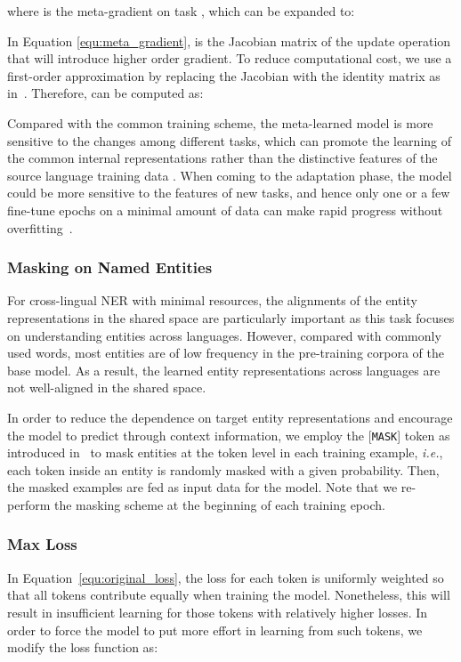 \documentclass[letterpaper]{article} \usepackage{aaai20}  \usepackage{times}  \usepackage{helvet} \usepackage{courier}  \usepackage[hyphens]{url}  \usepackage{graphicx} \urlstyle{rm} \def\UrlFont{\rm}  \usepackage{graphicx}
\newcommand{\ie}{\textit{i.e.}}
\begin{document}
where  is the meta-gradient on task , which can be expanded to:


In Equation \ref{equ:meta_gradient},  is the Jacobian matrix of the update operation  that will introduce higher order gradient.
To reduce computational cost, we use a first-order approximation by replacing the Jacobian  with the identity matrix as in~\cite{finn2017model}. Therefore,  can be computed as:


Compared with the common training scheme, the meta-learned model is more sensitive to the changes among different tasks, which can promote the learning of the common internal representations rather than the distinctive features of the source language training data .
When coming to the adaptation phase, the model could be more sensitive to the features of new tasks, and hence only one or a few fine-tune epochs on a minimal amount of data can make rapid progress without overfitting~\cite{finn2017model}.

\subsubsection{Masking on Named Entities} 
For cross-lingual NER with minimal resources, the alignments of the entity representations in the shared space are particularly important as this task focuses on understanding entities across languages. However, compared with commonly used words, most entities are of low frequency in the pre-training corpora of the base model. 
As a result, the learned entity representations across languages are not well-aligned in the shared space. 

In order to reduce the dependence on target entity representations and encourage the model to predict through context information, we employ the [\texttt{MASK}] token as introduced in~\cite{devlin2019bert} to mask entities at the token level in each training example, \ie, each token inside an entity is randomly masked with a given probability. Then, the masked examples are fed as input data for the model.
Note that we re-perform the masking scheme at the beginning of each training epoch.

\subsubsection{Max Loss}
In Equation~\ref{equ:original_loss}, the loss for each token is uniformly weighted so that all tokens contribute equally when training the model. 
Nonetheless, this will result in insufficient learning for those tokens with relatively higher losses. 
In order to force the model to put more effort in learning from such tokens, we modify the loss function as:
\end{document}
